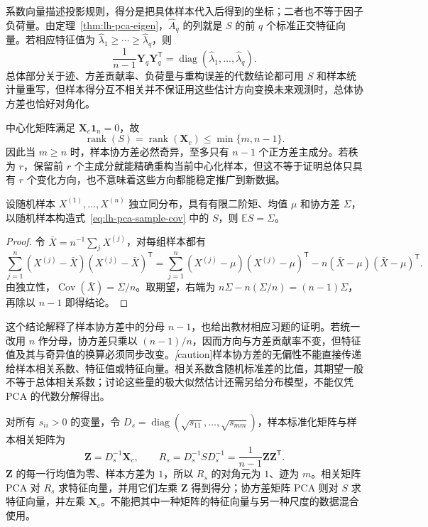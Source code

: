 系数向量描述投影规则，得分是把具体样本代入后得到的坐标；二者也不等于因子负荷量。由定理~\ref{thm:lh-pca-eigen}，$\widehat A_q$ 的列就是 $S$ 的前 $q$ 个标准正交特征向量。若相应特征值为 $\widehat\lambda_1\geq\cdots\geq\widehat\lambda_q$，则
\begin{equation}
\frac1{n-1}\mathbf Y_q\mathbf Y_q^{\mathsf T}
=\operatorname{diag}(\widehat\lambda_1,\ldots,\widehat\lambda_q).
\label{eq:lh-pca-score-cov}
\end{equation}
总体部分关于迹、方差贡献率、负荷量与重构误差的代数结论都可用 $S$ 和样本统计量重写，但样本得分互不相关并不保证用这些估计方向变换未来观测时，总体协方差也恰好对角化。

中心化矩阵满足 $\mathbf X_c\mathbf 1_n=0$，故
\begin{equation}
\operatorname{rank}(S)=\operatorname{rank}(\mathbf X_c)
\leq\min\{m,n-1\}.
\label{eq:lh-pca-sample-rank}
\end{equation}
因此当 $m\geq n$ 时，样本协方差必然奇异，至多只有 $n-1$ 个正方差主成分。若秩为 $r$，保留前 $r$ 个主成分就能精确重构当前中心化样本，但这不等于证明总体只具有 $r$ 个变化方向，也不意味着这些方向都能稳定推广到新数据。

\begin{proposition}[样本协方差的无偏性]
\label{prop:lh-pca-unbiased-cov}
设随机样本 $X^{(1)},\ldots,X^{(n)}$ 独立同分布，具有有限二阶矩、均值 $\mu$ 和协方差 $\Sigma$，以随机样本构造式~\eqref{eq:lh-pca-sample-cov} 中的 $S$，则 $\mathbb E S=\Sigma$。
\end{proposition}
\begin{proof}
令 $\bar X=n^{-1}\sum_jX^{(j)}$，对每组样本都有
\[
\sum_{j=1}^n(X^{(j)}-\bar X)(X^{(j)}-\bar X)^{\mathsf T}
=\sum_{j=1}^n(X^{(j)}-\mu)(X^{(j)}-\mu)^{\mathsf T}
-n(\bar X-\mu)(\bar X-\mu)^{\mathsf T}.
\]
由独立性，$\operatorname{Cov}(\bar X)=\Sigma/n$。取期望，右端为 $n\Sigma-n(\Sigma/n)=(n-1)\Sigma$，再除以 $n-1$ 即得结论。
\end{proof}

这个结论解释了样本协方差中的分母 $n-1$，也给出教材相应习题的证明。若统一改用 $n$ 作分母，协方差只乘以 $(n-1)/n$，因而方向与方差贡献率不变，但特征值及其与奇异值的换算必须同步改变。\emph[caution]{样本协方差的无偏性不能直接传递给样本相关系数、特征值或特征向量。}相关系数含随机标准差的比值，其期望一般不等于总体相关系数；讨论这些量的极大似然估计还需另给分布模型，不能仅凭 PCA 的代数分解得出。

对所有 $s_{ii}>0$ 的变量，令 $D_s=\operatorname{diag}(\sqrt{s_{11}},\ldots,\sqrt{s_{mm}})$，样本标准化矩阵与样本相关矩阵为
\begin{equation}
\mathbf Z=D_s^{-1}\mathbf X_c,\qquad
R_s=D_s^{-1}SD_s^{-1}
=\frac1{n-1}\mathbf Z\mathbf Z^{\mathsf T}.
\label{eq:lh-pca-sample-standardization}
\end{equation}
$\mathbf Z$ 的每一行均值为零、样本方差为 $1$，所以 $R_s$ 的对角元为 $1$、迹为 $m$。相关矩阵 PCA 对 $R_s$ 求特征向量，并用它们左乘 $\mathbf Z$ 得到得分；协方差矩阵 PCA 则对 $S$ 求特征向量，并左乘 $\mathbf X_c$。不能把其中一种矩阵的特征向量与另一种尺度的数据混合使用。

